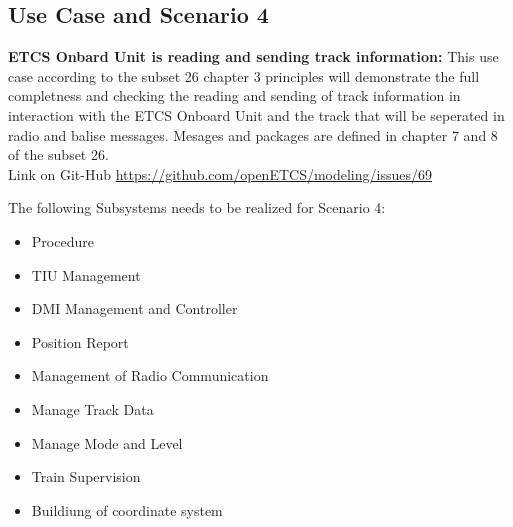 \subsection{Use Case and Scenario 4}
\textbf{ETCS Onbard Unit is reading and sending track information:}
This use case according to the subset 26 chapter 3 principles will demonstrate the full completness and checking the reading and sending of track information in interaction with the ETCS Onboard Unit and the track that will be seperated in radio and balise messages. Mesages and packages are defined in chapter 7 and 8 of the subset 26.\\ 
Link on Git-Hub \url{https://github.com/openETCS/modeling/issues/69}

The following Subsystems needs to be realized for Scenario 4:\\
\begin{itemize}
\item Procedure
\item TIU Management
\item DMI Management and Controller
\item Position Report
\item Management of Radio Communication
\item Manage Track Data
\item Manage Mode and Level
\item Train Supervision
\item Buildiung of coordinate system
\end{itemize}



